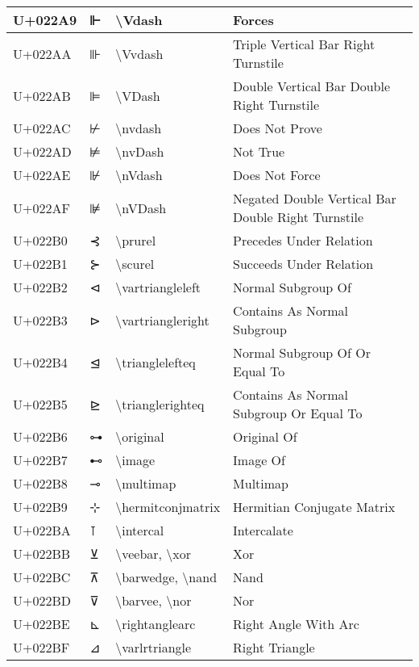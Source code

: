 \begin{table}[h]
\begin{tabulary}{\linewidth}{|L|L|L|L|}
\hline
U+022A9 & ⊩ & {\textbackslash}Vdash & Forces \\
\hline
U+022AA & ⊪ & {\textbackslash}Vvdash & Triple Vertical Bar Right Turnstile \\
\hline
U+022AB & ⊫ & {\textbackslash}VDash & Double Vertical Bar Double Right Turnstile \\
\hline
U+022AC & ⊬ & {\textbackslash}nvdash & Does Not Prove \\
\hline
U+022AD & ⊭ & {\textbackslash}nvDash & Not True \\
\hline
U+022AE & ⊮ & {\textbackslash}nVdash & Does Not Force \\
\hline
U+022AF & ⊯ & {\textbackslash}nVDash & Negated Double Vertical Bar Double Right Turnstile \\
\hline
U+022B0 & ⊰ & {\textbackslash}prurel & Precedes Under Relation \\
\hline
U+022B1 & ⊱ & {\textbackslash}scurel & Succeeds Under Relation \\
\hline
U+022B2 & ⊲ & {\textbackslash}vartriangleleft & Normal Subgroup Of \\
\hline
U+022B3 & ⊳ & {\textbackslash}vartriangleright & Contains As Normal Subgroup \\
\hline
U+022B4 & ⊴ & {\textbackslash}trianglelefteq & Normal Subgroup Of Or Equal To \\
\hline
U+022B5 & ⊵ & {\textbackslash}trianglerighteq & Contains As Normal Subgroup Or Equal To \\
\hline
U+022B6 & ⊶ & {\textbackslash}original & Original Of \\
\hline
U+022B7 & ⊷ & {\textbackslash}image & Image Of \\
\hline
U+022B8 & ⊸ & {\textbackslash}multimap & Multimap \\
\hline
U+022B9 & ⊹ & {\textbackslash}hermitconjmatrix & Hermitian Conjugate Matrix \\
\hline
U+022BA & ⊺ & {\textbackslash}intercal & Intercalate \\
\hline
U+022BB & ⊻ & {\textbackslash}veebar, {\textbackslash}xor & Xor \\
\hline
U+022BC & ⊼ & {\textbackslash}barwedge, {\textbackslash}nand & Nand \\
\hline
U+022BD & ⊽ & {\textbackslash}barvee, {\textbackslash}nor & Nor \\
\hline
U+022BE & ⊾ & {\textbackslash}rightanglearc & Right Angle With Arc \\
\hline
U+022BF & ⊿ & {\textbackslash}varlrtriangle & Right Triangle \\

\end{tabulary}
\end{table}
